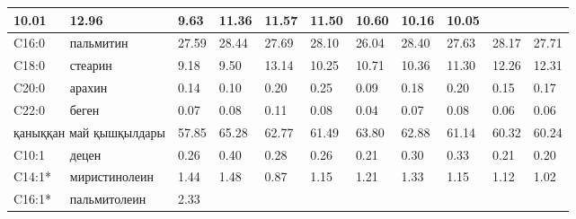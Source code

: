 \begin{table}[H]
{\begin{tabular}{|ll|lll|lll|lll|}
    \multicolumn{1}{l|}{10.01} &
    \multicolumn{1}{l|}{12.96} &
    9.63 &
    \multicolumn{1}{l|}{11.36} &
    \multicolumn{1}{l|}{11.57} &
    11.50 &
    \multicolumn{1}{l|}{10.60} &
    \multicolumn{1}{l|}{10.16} &
    10.05 \\ \hline
  \multicolumn{1}{|l|}{C16:0} &
    пальмитин &
    \multicolumn{1}{l|}{27.59} &
    \multicolumn{1}{l|}{28.44} &
    27.69 &
    \multicolumn{1}{l|}{28.10} &
    \multicolumn{1}{l|}{26.04} &
    28.40 &
    \multicolumn{1}{l|}{27.63} &
    \multicolumn{1}{l|}{28.17} &
    27.71 \\ \hline
  \multicolumn{1}{|l|}{C18:0} &
    стеарин &
    \multicolumn{1}{l|}{9.18} &
    \multicolumn{1}{l|}{9.50} &
    13.14 &
    \multicolumn{1}{l|}{10.25} &
    \multicolumn{1}{l|}{10.71} &
    10.36 &
    \multicolumn{1}{l|}{11.30} &
    \multicolumn{1}{l|}{12.26} &
    12.31 \\ \hline
  \multicolumn{1}{|l|}{C20:0} &
    арахин &
    \multicolumn{1}{l|}{0.14} &
    \multicolumn{1}{l|}{0.10} &
    0.20 &
    \multicolumn{1}{l|}{0.25} &
    \multicolumn{1}{l|}{0.09} &
    0.18 &
    \multicolumn{1}{l|}{0.20} &
    \multicolumn{1}{l|}{0.15} &
    0.17 \\ \hline
  \multicolumn{1}{|l|}{C22:0} &
    беген &
    \multicolumn{1}{l|}{0.07} &
    \multicolumn{1}{l|}{0.08} &
    0.11 &
    \multicolumn{1}{l|}{0.08} &
    \multicolumn{1}{l|}{0.04} &
    0.07 &
    \multicolumn{1}{l|}{0.08} &
    \multicolumn{1}{l|}{0.06} &
    0.06 \\ \hline
  \multicolumn{2}{|l|}{қаныққан май қышқылдары} &
    \multicolumn{1}{l|}{57.85} &
    \multicolumn{1}{l|}{65.28} &
    62.77 &
    \multicolumn{1}{l|}{61.49} &
    \multicolumn{1}{l|}{63.80} &
    62.88 &
    \multicolumn{1}{l|}{61.14} &
    \multicolumn{1}{l|}{60.32} &
    60.24 \\ \hline
  \multicolumn{1}{|l|}{C10:1} &
    децен &
    \multicolumn{1}{l|}{0.26} &
    \multicolumn{1}{l|}{0.40} &
    0.28 &
    \multicolumn{1}{l|}{0.26} &
    \multicolumn{1}{l|}{0.21} &
    0.30 &
    \multicolumn{1}{l|}{0.33} &
    \multicolumn{1}{l|}{0.21} &
    0.20 \\ \hline
  \multicolumn{1}{|l|}{C14:1*} &
    миристинолеин &
    \multicolumn{1}{l|}{1.44} &
    \multicolumn{1}{l|}{1.48} &
    0.87 &
    \multicolumn{1}{l|}{1.15} &
    \multicolumn{1}{l|}{1.21} &
    1.33 &
    \multicolumn{1}{l|}{1.15} &
    \multicolumn{1}{l|}{1.12} &
    1.02 \\ \hline
  \multicolumn{1}{|l|}{C16:1*} &
    пальмитолеин &
    \multicolumn{1}{l|}{2.33} &

\end{tabular}}
\end{table}
